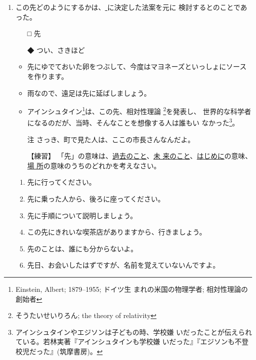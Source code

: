 \documentclass[
uplatex,
b5paper,
10pt,
dvipdfmx
]{jsbook}
\begin{document}
\begin{enumerate}
 \item この先どのようにするかは、\underline{   }に決定した法案を元に
      検討するとのことであった。 

 \begin{itemize}
  \item[□] 先
  \item[◆] つい、さきほど
 \end{itemize}

\begin{itemize}
 \item 先にゆでておいた卵をつぶして、今度はマヨネーズといっしょにソース
       を作ります。
 \item 雨なので、遠足は先に延ばしましょう。
 \item アインシュタイン\footnote{Einstein, Albert; 1879--1955; ドイツ生
       まれの米国の物理学者; 相対性理論の創始者}は、この先、相対性理論
       \footnote{そうたいせいりろん; the theory of relativity}を発表し、
       世界的な科学者になるのだが、当時、そんなことを想像する人は誰もい
       なかった\footnote{アインシュタインやエジソンは子どもの時、学校嫌
       いだったことが伝えられている。若林実著『アインシュタインも学校嫌
       いだった』『エジソンも不登校児だった』(筑摩書房)。}。
 \item[注] さっき、町で見た人は、ここの市長さんなんだよ。
\end{itemize}


 \begin{itemize}
  \item[【練習】] 「先」の意味は、\underline{過去のこと}、\underline{未
		  来のこと}、\underline{はじめに}の意味、\underline {場
		  所}の意味のうちのどれかを考えなさい。
 \end{itemize}

\begin{enumerate}\itemsep=-4pt
 \item 先に行ってください。
 \item 先に乗った人から、後ろに座ってください。
 \item 先に手順について説明しましょう。
 \item この先にきれいな喫茶店がありますから、行きましょう。
 \item 先のことは、誰にも分からないよ。
 \item 先日、お会いしたはずですが、名前を覚えていないんですよ。
\end{enumerate}
\end{enumerate}
\end{document}
